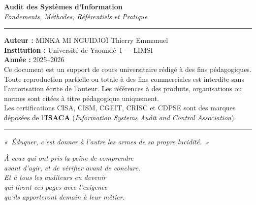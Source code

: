 \documentclass[12pt, a4paper, twoside, openright]{book}
\begin{document}
\begin{center}
    \begin{minipage}{0.78\textwidth}
        \footnotesize\color{CouleurBordInfo}
        \begin{center}
            {\bfseries\color{CouleurPrimaire}
                Audit des Systèmes d'Information}\\[0.4ex]
            {\itshape Fondements, Méthodes, Référentiels et Pratique}
        \end{center}
        \vspace{0.8ex}
        \hrule
        \vspace{0.8ex}
        \textbf{Auteur :} MINKA MI NGUIDJOÏ Thierry Emmanuel\\
        \textbf{Institution :} Université de Yaoundé~I — LIMSI\\
        \textbf{Année :} 2025--2026\\[0.5ex]
        Ce document est un support de cours universitaire rédigé à des fins
        pédagogiques. Toute reproduction partielle ou totale à des fins commerciales
        est interdite sans l'autorisation écrite de l'auteur. Les références à des
        produits, organisations ou normes sont citées à titre pédagogique uniquement.\\[0.5ex]
        Les certifications CISA, CISM, CGEIT, CRISC et CDPSE sont des marques
        déposées de l'\textbf{ISACA} (\textit{Information Systems Audit and Control Association}).\\[0.5ex]
        
        \hrule
        \vspace{0.5ex}
        {\centering\itshape
        «~Éduquer, c'est donner à l'autre les armes de sa propre lucidité.~»}
    \end{minipage}
\end{center}

\vspace*{\fill}

\clearpage
\thispagestyle{empty}
\vspace*{3cm}
\begin{flushright}
    \begin{minipage}{0.6\textwidth}
        \itshape\large\color{CouleurPrimaire}
        À ceux qui ont pris la peine de comprendre\\
        avant d'agir, et de vérifier avant de conclure.\\[1.5ex]
        \normalsize\normalfont\color{CouleurAccent}
        Et à tous les auditeurs en devenir\\
        qui liront ces pages avec l'exigence\\
        qu'ils apporteront demain à leur métier.
    \end{minipage}
\end{flushright}
\end{document}
